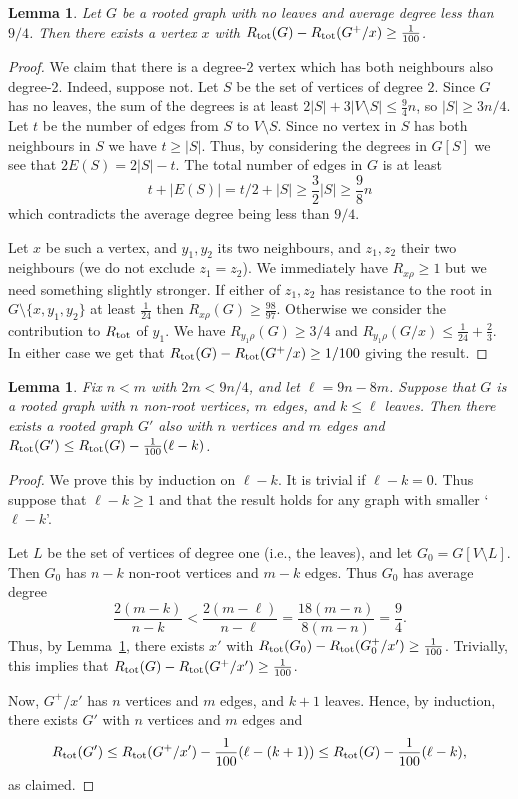 \documentclass[11pt]{article}
\newtheorem{lemma}[theorem]{Lemma}
\theoremstyle{remark}
\newcommand\rtot{R_{{\rm tot}}}
\begin{document}
\begin{lemma}\label{l:weight-resistance}
  Let $G$ be a rooted graph with no leaves and average degree less
  than $9/4$. Then  there exists a vertex $x$ with
  $\rtot(G)-\rtot(G^+/x)\ge \frac1{100}$.
\end{lemma}
\begin{proof}
  We claim that there is a degree-2 vertex which has both neighbours
  also degree-2. Indeed, suppose not.  Let $S$ be the set of vertices
  of degree $2$.  Since $G$ has no leaves, the sum of the degrees
  is at least $2|S|+3|V\setminus S|\le \frac94n$, so $|S|\ge
  3n/4$. Let $t$ be the number of edges from $S$ to $V\setminus
  S$. Since no vertex in $S$ has both neighbours in $S$ we have $t\ge
  |S|$. Thus, by considering the degrees in $G[S]$ we see that
  $2E(S)=2|S|-t$. The total number of edges in $G$ is at least
  \[
  t+|E(S)|=t/2+|S|\ge \frac32|S|\ge \frac98n
  \]
  which contradicts the average degree being less than $9/4$.

  Let $x$ be such a vertex, and $y_1,y_2$ its two neighbours, and
  $z_1,z_2$ their two neighbours (we do not exclude $z_1=z_2$). We
  immediately have $R_{x\rho}\ge 1$ but we need something slightly
  stronger. If either of $z_1,z_2$ has resistance to the root in
  $G\setminus \{x,y_1,y_2\}$ at least $\frac1{24}$ then
  $R_{x\rho}(G)\ge \frac{98}{97}$. Otherwise we consider the
  contribution to $\rtot$ of $y_1$.  We have $R_{y_1\rho}(G)\ge 3/4$
  and $R_{y_1\rho}(G/x)\le \frac1{24}+\frac23$. In either case we get
  that $\rtot(G)-\rtot(G^+/x)\ge 1/100$ giving
  the result.
\end{proof}

\begin{lemma}\label{l:leaves-rooted}
  Fix $n<m$ with $2m<9n/4$, and let
  $\ell=9n-8m$. Suppose that $G$ is a rooted graph
  with $n$ non-root vertices, $m$ edges, and $k\le \ell$ leaves. Then
  there exists a rooted graph $G'$ also with $n$ vertices and $m$
  edges and $\rtot(G')\le \rtot(G)-\frac1{100}(\ell-k)$.
\end{lemma}
\begin{proof}
  We prove this by induction on $\ell-k$. It is trivial if $\ell-k=0$.
  Thus suppose that $\ell-k\ge 1$ and that the result holds for any
  graph with smaller `$\ell-k$'.

  Let $L$ be the set of vertices of degree one (i.e., the leaves), and
  let $G_0=G[V\setminus L]$. Then $G_0$ has $n-k$ non-root vertices
  and $m-k$ edges. Thus $G_0$ has average degree
  \[
  \frac{2(m-k)}{n-k}<
  \frac{2(m-\ell)}{n-\ell}=\frac{18(m-n)}{8(m-n)}=\frac94.
  \]
  Thus, by Lemma~\ref{l:weight-resistance}, there exists $x'$ with
  $\rtot(G_0)-\rtot(G_0^+/x')\ge \frac1{100}$. Trivially, this implies
  that $\rtot(G)-\rtot(G^+/x')\ge \frac1{100}$.

  Now, $G^+/x'$ has $n$ vertices and $m$ edges, and $k+1$
  leaves. Hence, by induction, there exists $G'$ with $n$ vertices and
  $m$ edges and
  \[
  \rtot(G')\le \rtot(G^+/x')-\frac1{100}(\ell-(k+1)) \le
  \rtot(G)-\frac1{100}(\ell-k),
  \] as claimed.
\end{proof}
\end{document}
